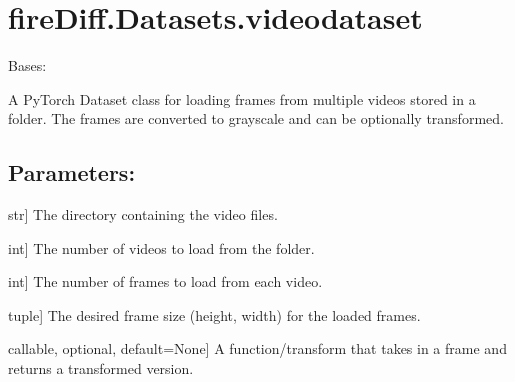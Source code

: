\documentclass[a4paper,10pt,english]{sphinxmanual}
\begin{document}
\section{fireDiff.Datasets.videodataset}
\label{\detokenize{datasets:module-fireDiff.Datasets.videodataset}}\label{\detokenize{datasets:firediff-datasets-videodataset}}

\begin{fulllineitems}
\label{\detokenize{datasets:fireDiff.Datasets.videodataset.VideoDataset}}
\pysigstartsignatures
{}
\pysigstopsignatures
\sphinxAtStartPar
Bases: 

\sphinxAtStartPar
A PyTorch Dataset class for loading frames from multiple videos stored in
a folder. The frames are converted to grayscale and can be optionally
transformed.


\subsection{Parameters:}
\label{\detokenize{datasets:id1}}\begin{description}
\sphinxlineitem{video\_folder}{[}str{]}
\sphinxAtStartPar
The directory containing the video files.

\sphinxlineitem{num\_videos}{[}int{]}
\sphinxAtStartPar
The number of videos to load from the folder.

\sphinxlineitem{num\_frames\_per\_video}{[}int{]}
\sphinxAtStartPar
The number of frames to load from each video.

\sphinxlineitem{frame\_size}{[}tuple{]}
\sphinxAtStartPar
The desired frame size (height, width) for the loaded frames.

\sphinxlineitem{transform}{[}callable, optional, default=None{]}
\sphinxAtStartPar
A function/transform that takes in a frame and returns a transformed
version.


\end{description}
\end{fulllineitems}
\end{document}
